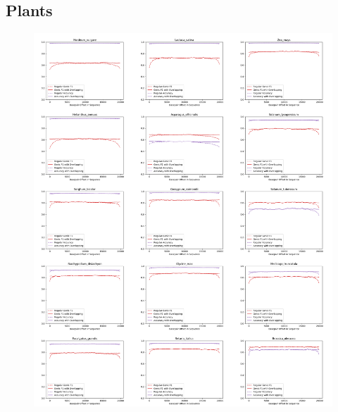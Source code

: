 \documentclass{article}
\begin{document}
\clearpage
\subsection{Plants}

\begin{figure}[!h]
\centerline{\includegraphics[width=1.2\textwidth]{images/overlapping/montage_plants1}}
\end{figure}
\end{document}
